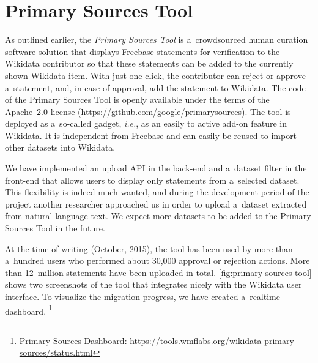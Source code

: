 \documentclass{acm_proc_article-sp}
\begin{document}
\section{Primary Sources Tool}\label{sec:primary-sources-tool}

As outlined earlier, the \emph{Primary Sources Tool} is a~crowdsourced human curation
software solution that displays Freebase statements for verification to the Wikidata contributor
so that these statements can be added to the currently shown Wikidata item.
With just one click, the contributor can reject or approve a~statement,
and, in case of approval, add the statement to Wikidata.
The code of the Primary Sources Tool is openly available
under the terms of the Apache~2.0 license (\url{https://github.com/google/primarysources}).
The tool is deployed as a~so-called gadget,
\emph{i.e.}, as an easily to active add-on feature in Wikidata.
It is independent from Freebase and can easily be reused to import other datasets into Wikidata.

We have implemented an upload API in the back-end
and a~dataset filter in the front-end that allows users
to display only statements from a~selected dataset.
This flexibility is indeed much-wanted, and during the development period of the project
another researcher approached us in order to upload
a~dataset extracted from natural language text.
We expect more datasets to be added to the Primary Sources Tool in the future.

At the time of writing (October, 2015), the tool has been used by more than a~hundred users
who performed about 30,000 approval or rejection actions.
More than 12~million statements have been uploaded in total.
\autoref{fig:primary-sources-tool} shows two screenshots
of the tool that integrates nicely with the Wikidata user interface.
To visualize the migration progress, we have created a~realtime dashboard.%
\footnote{Primary Sources Dashboard:
\url{https://tools.wmflabs.org/wikidata-primary-sources/status.html}}
\end{document}
